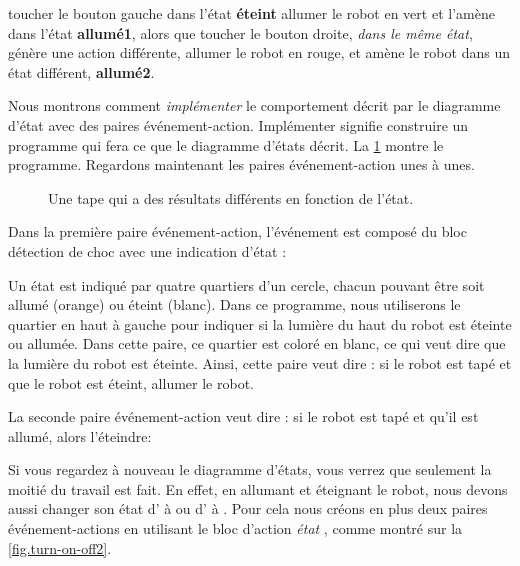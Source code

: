 toucher le bouton gauche dans l'état \textbf{éteint} allumer le robot en vert et l'amène dans l'état \textbf{allumé1}, alors que toucher le bouton droite, \emph{dans le même état}, génère une action différente, allumer le robot en rouge, et amène le robot dans un état différent, \textbf{allumé2}.


Nous montrons comment \emph{implémenter} le comportement décrit par le diagramme d'état avec des paires événement-action.
Implémenter signifie construire un programme qui fera ce que le diagramme d'états décrit.
La \cref{fig.turn-on-off} montre le programme.
Regardons maintenant les paires événement-action unes à unes.

\begin{figure}
	\hfill
	\caption{Une tape qui a des résultats différents en fonction de l'état.}
	\label{fig.turn-on-off}
\end{figure}

Dans la première paire événement-action, l'événement est composé du bloc détection de choc avec une indication d'état : 

Un état est indiqué par quatre quartiers d'un cercle, chacun pouvant être soit allumé (orange) ou éteint (blanc).
Dans ce programme, nous utiliserons le quartier en haut à gauche pour indiquer si la lumière du haut du robot est éteinte ou allumée.
Dans cette paire, ce quartier est coloré en blanc, ce qui veut dire que la lumière du robot est éteinte.
Ainsi, cette paire veut dire : si le robot est tapé et que le robot est éteint, allumer le robot.

La seconde paire événement-action veut dire : si le robot est tapé et qu'il est allumé, alors l'éteindre: 

Si vous regardez à nouveau le diagramme d'états, vous verrez que seulement la moitié du travail est fait.
En effet, en allumant et éteignant le robot, nous devons aussi changer son état d' à  ou d' à .
Pour cela nous créons en plus deux paires événement-actions en utilisant le bloc d'action \emph{état} , comme montré sur la \cref{fig.turn-on-off2}.

